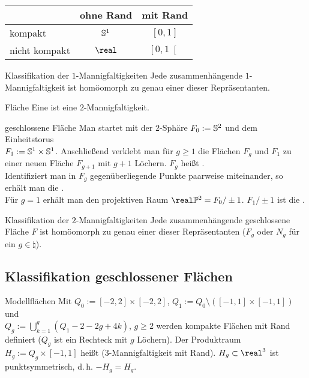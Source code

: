 \begin{tabular}{l|cc}
    & ohne Rand & mit Rand \\ \hline
    kompakt & $\mathbb{S}^1$ & $[0, 1]$ \\
    nicht kompakt & $\real$ & $\left[0, 1\right[$
\end{tabular}

\begin{Satz}{Klassifikation der $1$-Mannigfaltigkeiten}
    Jede zusammenhängende $1$-Mannigfaltigkeit ist homöomorph zu genau einer
    dieser Repräsentanten.
\end{Satz}

\linie

\begin{Def}{Fläche}
    Eine  ist eine $2$-Mannigfaltigkeit.
\end{Def}

\begin{Def}{geschlossene Fläche}
    Man startet mit der $2$-Sphäre $F_0 := \mathbb{S}^2$ und dem Einheitstorus \\
    $F_1 := \mathbb{S}^1 \times \mathbb{S}^1$.
    Anschließend verklebt man für $g \ge 1$ die Flächen $F_g$ und $F_1$ zu
    einer neuen Fläche $F_{g+1}$ mit $g + 1$ Löchern.
    $F_g$ heißt . \\
    Identifiziert man in $F_g$ gegenüberliegende Punkte paarweise miteinander,
    so erhält man die . \\
    Für $g = 1$ erhält man den projektiven Raum
    $\real\projective^2 = F_0/\pm 1$.
    $F_1/\pm 1$ ist die .
\end{Def}

\begin{Satz}{Klassifikation der $2$-Mannigfaltigkeiten}
    Jede zusammenhängende geschlossene Fläche $F$
    ist homöomorph zu genau einer dieser
    Repräsentanten ($F_g$ oder $N_g$ für ein $g \in \natural$).
\end{Satz}

\pagebreak

\subsection{%
    Klassifikation geschlossener Flächen%
}

\begin{Def}{Modellflächen}
    Mit $Q_0 := [-2, 2] \times [-2, 2]$,
    $Q_1 := Q_0 \setminus ([-1, 1] \times [-1, 1])$ und \\
    $Q_g := \bigcup_{k=1}^g (Q_1 - 2 - 2g + 4k)$, $g \ge 2$
    werden kompakte Flächen mit Rand definiert
    ($Q_g$ ist ein Rechteck mit $g$ Löchern).
    Der Produktraum $H_g := Q_g \times [-1, 1]$ heißt
    ($3$-Mannigfaltigkeit mit Rand).
    $H_g \subset \real^3$ ist punktsymmetrisch, d.\,h. $-H_g = H_g$.
\end{Def}

